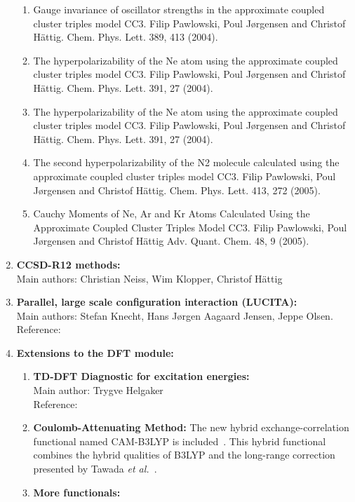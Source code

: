 \begin{enumerate}
\begin{enumerate}
\item	Gauge invariance of oscillator strengths in the approximate
coupled
cluster triples model CC3.
Filip Pawlowski, Poul J\o rgensen and Christof H\"{a}ttig.
Chem. Phys. Lett. 389, 413 (2004).

\item	The hyperpolarizability of the Ne atom using the approximate
coupled cluster triples model CC3.
Filip Pawlowski, Poul J\o rgensen and Christof H\"{a}ttig.
Chem. Phys. Lett. 391, 27 (2004).

\item	The hyperpolarizability of the Ne atom using the approximate
coupled cluster triples model CC3.
Filip Pawlowski, Poul J\o rgensen and Christof H\"{a}ttig.
Chem. Phys. Lett. 391, 27 (2004).

\item	The second hyperpolarizability of the N2 molecule calculated using
the approximate coupled cluster triples model CC3.
Filip Pawlowski, Poul J\o rgensen and Christof H\"{a}ttig.
Chem. Phys. Lett. 413, 272 (2005).

\item	Cauchy Moments of Ne, Ar and Kr Atoms Calculated Using the
Approximate Coupled Cluster Triples Model CC3.
Filip Pawlowski, Poul J\o rgensen and Christof H\"{a}ttig
Adv. Quant. Chem. 48, 9 (2005).
\end{enumerate}


\item{\bf CCSD-R12 methods:} \\
Main authors: Christian Neiss, Wim Klopper, Christof H\"{a}ttig

\item{\bf Parallel, large scale configuration interaction (LUCITA):} \\
Main authors: Stefan Knecht, Hans J\o rgen Aagaard Jensen, Jeppe Olsen.\\
Reference:  \cite{knecht08}

\item{\bf Extensions to the DFT module:}
\begin{enumerate}
  \item{\bf TD-DFT Diagnostic for excitation energies:}  \\
   Main author: Trygve Helgaker \\
   Reference: \cite{mjgppbthdjtjcp128}
  \item{\bf Coulomb-Attenuating Method:} The new hybrid
    exchange-correlation functional named CAM-B3LYP is
    included~\cite{tydptnchcpl393}. This hybrid functional  combines the
    hybrid qualities of B3LYP and the long-range correction presented by
    Tawada {\it et al.\/}~\cite{ytttsytykhjcp120}.
  \item{\bf More functionals:}
\end{enumerate}


\end{enumerate}
